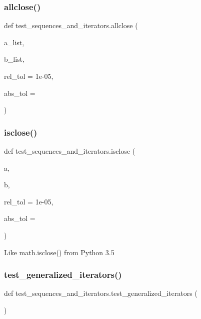 \subsubsection{\texorpdfstring{allclose()}{allclose()}}
{\footnotesize\ttfamily def test\+\_\+sequences\+\_\+and\+\_\+iterators.\+allclose (\begin{DoxyParamCaption}\item[{}]{a\+\_\+list,  }\item[{}]{b\+\_\+list,  }\item[{}]{rel\+\_\+tol = {\ttfamily 1e-\/05},  }\item[{}]{abs\+\_\+tol = {} }\end{DoxyParamCaption})}

\mbox{\label{namespacetest__sequences__and__iterators_ad1bef1ddb9a84273aa9421241f77a1b8}} 
\subsubsection{\texorpdfstring{isclose()}{isclose()}}
{\footnotesize\ttfamily def test\+\_\+sequences\+\_\+and\+\_\+iterators.\+isclose (\begin{DoxyParamCaption}\item[{}]{a,  }\item[{}]{b,  }\item[{}]{rel\+\_\+tol = {\ttfamily 1e-\/05},  }\item[{}]{abs\+\_\+tol = {} }\end{DoxyParamCaption})}

\begin{DoxyVerb}Like math.isclose() from Python 3.5\end{DoxyVerb}
 \mbox{\label{namespacetest__sequences__and__iterators_a8fdeb86fc58d12a2bf80a0841f2c31b4}} 
\subsubsection{\texorpdfstring{test\_generalized\_iterators()}{test\_generalized\_iterators()}}
{\footnotesize\ttfamily def test\+\_\+sequences\+\_\+and\+\_\+iterators.\+test\+\_\+generalized\+\_\+iterators (\begin{DoxyParamCaption}{ }\end{DoxyParamCaption})}

